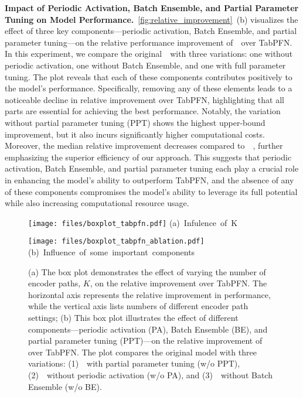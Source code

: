 \textbf{Impact of Periodic Activation, Batch Ensemble, and Partial Parameter Tuning on Model Performance.}~\autoref{fig:relative_improvement}~(b) visualizes the effect of three key components—periodic activation, Batch Ensemble, and partial parameter tuning—on the relative performance improvement of~\name~over TabPFN. In this experiment, we compare the original~\name~with three variations: one without periodic activation, one without Batch Ensemble, and one with full parameter tuning. The plot reveals that each of these components contributes positively to the model’s performance. Specifically, removing any of these elements leads to a noticeable decline in relative improvement over TabPFN, highlighting that all parts are essential for achieving the best performance. Notably, the variation without partial parameter tuning (PPT) shows the highest upper-bound improvement, but it also incurs significantly higher computational costs. Moreover, the median relative improvement decreases compared to~\name~, further emphasizing the superior efficiency of our approach. This suggests that periodic activation, Batch Ensemble, and partial parameter tuning each play a crucial role in enhancing the model's ability to outperform TabPFN, and the absence of any of these components compromises the model's ability to leverage its full potential while also increasing computational resource usage. 
\begin{figure}[H]
\begin{minipage}{0.48\linewidth}
    \texttt{[image: files/boxplot\_tabpfn.pdf]}
    \centering
    {\small \mbox{(a) {Infulence of K}}}
    \end{minipage}
    \begin{minipage}{0.48\linewidth}
    \texttt{[image: files/boxplot\_tabpfn\_ablation.pdf]}
    \centering
    {\small \mbox{(b) {Influence of some important components}}}
    \end{minipage}

    \caption{(a) The box plot demonstrates the effect of varying the number of encoder paths, $K$, on the relative improvement over TabPFN. The horizontal axis represents the relative improvement in performance, while the vertical axis lists numbers of different encoder path settings; (b) This box plot illustrates the effect of different components—periodic activation (PA), Batch Ensemble (BE), and partial parameter tuning (PPT)—on the relative improvement of~\name~ over TabPFN. The plot compares the original \name model with three variations: (1)~\name~with partial parameter tuning (w/o PPT), (2)~\name~without periodic activation (w/o PA), and (3)~\name~without Batch Ensemble (w/o BE). }
\end{figure}
